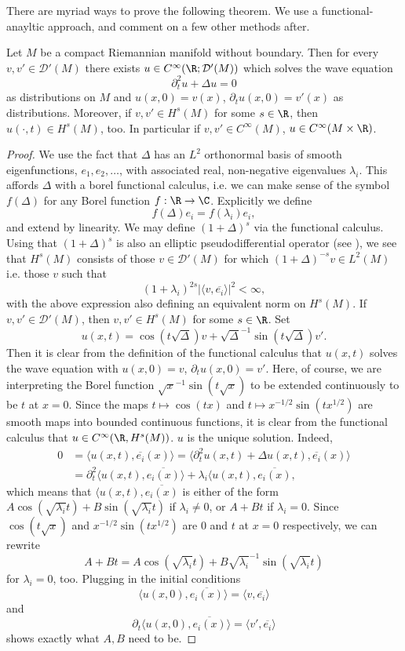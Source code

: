 \documentclass[12pt]{article}
\begin{document}
There are myriad ways to prove the following theorem. We use a functional-anayltic approach, and comment on a few other methods after.
\begin{thm}\label{exuqq}Let $M$ be a compact Riemannian manifold without boundary. Then for every $v,v' \in \mathcal D'(M)$ there exists $u \in C^\infty(\R;\mathcal D'(M))$ which solves the wave equation
\[\partial_t^2 u + \Delta u = 0\] as distributions on $M$ and $u(x,0) = v(x)$, $\partial_t u(x,0) = v'(x)$ as distributions. Moreover, if $v,v' \in H^s(M)$ for some $s \in \R$, then $u(\cdot, t) \in H^s(M)$, too. In particular if $v,v' \in C^\infty(M)$, $u \in C^\infty(M\times \R)$.\end{thm}
\begin{proof}We use the fact that $\Delta$ has an $L^2$ orthonormal basis of smooth eigenfunctions, $e_1,e_2,\ldots$, with associated real, non-negative eigenvalues $\lambda_i$. This affords $\Delta$ with a borel functional calculus, i.e. we can make sense of the symbol $f(\Delta)$ for any Borel function $f:\R \to \C$. Explicitly we define
\[f(\Delta)e_i = f(\lambda_i)e_i,\] and extend by linearity. We may define $(1+\Delta)^s$ via the functional calculus. Using that $(1+\Delta)^s$ is also an elliptic pseudodifferential operator (see \cite[Chapter 2]{Shub}), we see that $H^s(M)$ consists of those $v \in \mathcal D'(M)$ for which $(1+\Delta)^{-s}v \in L^2(M)$ i.e. those $v$ such that
\[(1+\lambda_i)^{2s}|\langle v,\overline{e_i}\rangle|^2 < \infty,\]
with the above expression also defining an equivalent norm on $H^s(M)$.
If $v,v' \in \mathcal D'(M)$, then $v,v' \in H^s(M)$ for some $s \in \R$. 
Set
\[u(x,t) = \cos(t\sqrt{\Delta})v + \sqrt{\Delta}^{-1}\sin(t\sqrt{\Delta})v'.\]
Then it is clear from the definition of the functional calculus that $u(x,t)$ solves the wave equation with $u(x,0) = v$, $\partial_t u(x,0) = v'$. Here, of course, we are interpreting the Borel function $\sqrt{x}^{-1}\sin(t\sqrt{x})$ to be extended continuously to be $t$ at $x=0$. Since the maps $t \mapsto \cos(tx)$ and $t \mapsto x^{-1/2}\sin(tx^{1/2})$ are smooth maps into bounded continuous functions, it is clear from the functional calculus that $u \in C^\infty(\R,H^s(M))$. $u$ is the unique solution. Indeed,
\begin{align*}
0 &= \langle u(x,t),\overline{e_i}(x)\rangle = \langle \partial_t^2 u(x,t) + \Delta u(x,t),\overline{e_i}(x)\rangle\\
&= \partial_t^2 \langle u(x,t),\overline{e_i(x)}\rangle + \lambda_i\langle u(x,t),\overline{e_i(x)},\end{align*}
which means that $\langle u(x,t),\overline{e_i(x)}$ is either of the form $A\cos(\sqrt{\lambda_i}t)+B\sin(\sqrt{\lambda_i}t)$ if $\lambda_i \neq 0$, or $A+Bt$ if $\lambda_i = 0$.
Since $\cos(t\sqrt{x})$ and $x^{-1/2}\sin(tx^{1/2})$ are $0$ and $t$ at $x=0$ respectively, we can rewrite \[A+Bt = A\cos(\sqrt{\lambda_i}t)+B\sqrt{\lambda_i}^{-1}\sin(\sqrt{\lambda_i}t)\] for $\lambda_i = 0$, too. Plugging in the initial conditions \[\langle u(x,0),\overline{e_i(x)}\rangle = \langle v,\overline{e_i}\rangle\] and \[\partial_t\langle u(x,0),\overline{e_i(x)}\rangle = \langle v',\overline{e_i}\rangle\]
shows exactly what $A,B$ need to be.
\end{proof}
\end{document}
